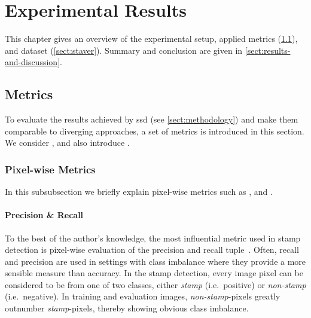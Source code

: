 \section{Experimental Results}
This chapter gives an overview of the experimental setup, applied metrics
(\cref{sect:metrics}), and dataset (\cref{sect:staver}). Summary and conclusion
are given in \cref{sect:results-and-discussion}.

\subsection{Metrics}\label{sect:metrics}
To evaluate the results achieved by \gls{ssd} (see \cref{sect:methodology}) and
make them comparable to diverging approaches, a set of metrics is introduced in
this section. We consider , 
and also introduce .

\subsubsection{Pixel-wise Metrics}\label{subsect:pixel-wise-metrics}
In this subsubsection we briefly explain pixel-wise metrics such as
,  and .

\paragraph{Precision \& Recall}\label{par:precision-recall}
To the best of the author's knowledge, the most influential metric used in stamp 
detection is pixel-wise evaluation of the precision and recall
tuple~\cite{Nandedkar.2015b,Younas.2017,Ahmed.2013,Dey.2015,Micenkova.2011, Bhalgat.2016, Micenkova.2015,Nandedkar.2015b}.
Often, recall and precision are used in settings with class imbalance where they
provide a more sensible measure than accuracy. In the stamp detection, every
image pixel can be considered to be from one of two classes, either
\textit{stamp} (i.e.\ positive) or \textit{non-stamp} (i.e.\ negative). In
training and evaluation images, \textit{non-stamp}-pixels greatly outnumber
\textit{stamp}-pixels, thereby showing obvious class imbalance.

